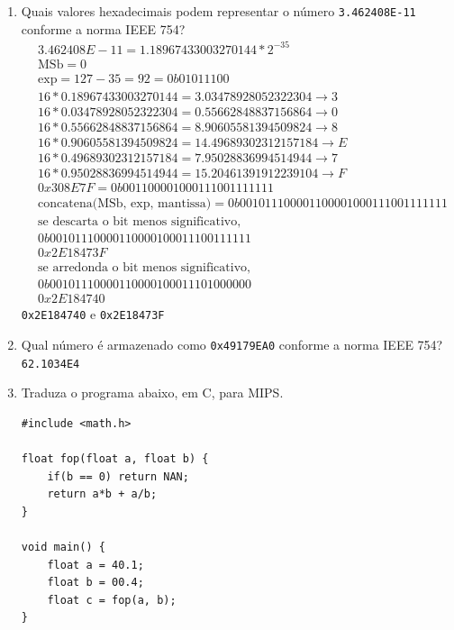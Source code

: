 \documentclass{article}
\begin{document}
\begin{enumerate}
\item Quais valores hexadecimais podem representar o número \verb|3.462408E-11| conforme a norma IEEE 754?
\begin{align*}
&3.462408E-11 = 1.18967433003270144*2^{-35} \\ 
&\text{MSb} = 0 \\
&\text{exp} = 127 - 35 = 92 = 0b01011100 \\
&16*0.18967433003270144 = 3.03478928052322304  \rightarrow 3 \\
&16*0.03478928052322304 = 0.55662848837156864  \rightarrow 0 \\
&16*0.55662848837156864 = 8.90605581394509824  \rightarrow 8 \\
&16*0.90605581394509824 = 14.49689302312157184 \rightarrow E \\
&16*0.49689302312157184 = 7.95028836994514944  \rightarrow 7 \\
&16*0.95028836994514944 = 15.20461391912239104 \rightarrow F \\
&0x308E7F = 0b001100001000111001111111 \\
&\text{concatena(MSb, exp, mantissa)} = 0b001011100001100001000111001111111 \\
&\text{se descarta o bit menos significativo,} \\
&0b00101110000110000100011100111111 \\
&0x2E18473F \\
&\text{se arredonda o bit menos significativo,} \\
&0b00101110000110000100011101000000 \\
&0x2E184740
\end{align*}
\verb|0x2E184740| e \verb|0x2E18473F|

\item Qual número é armazenado como \verb|0x49179EA0| conforme a norma IEEE 754?
\verb|62.1034E4|

\item Traduza o programa abaixo, em C, para MIPS.

\begin{center}
    \begin{minipage}{0.475\textwidth}
        \begin{lstlisting}[frame=single]
#include <math.h>

float fop(float a, float b) {
    if(b == 0) return NAN;
    return a*b + a/b;
}

void main() {
    float a = 40.1;
    float b = 00.4;
    float c = fop(a, b);
}
        \end{lstlisting}
    \end{minipage}
\end{center}


\end{enumerate}
\end{document}
